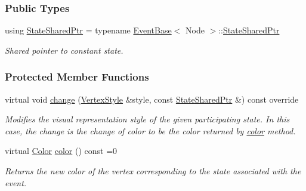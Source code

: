 \subsubsection*{Public Types}
\begin{DoxyCompactItemize}
\item 
using \hyperlink{structVertexColor_abb3b580256337f76f3071263e73d0e49}{State\+Shared\+Ptr} = typename \hyperlink{structEventBase}{Event\+Base}$<$ Node $>$\+::\hyperlink{structEventBase_a2c0edb5cda08ce1965f3440a97b3fc87}{State\+Shared\+Ptr}\hypertarget{structVertexColor_abb3b580256337f76f3071263e73d0e49}{}\label{structVertexColor_abb3b580256337f76f3071263e73d0e49}

\begin{DoxyCompactList}\small\item\em Shared pointer to constant state. \end{DoxyCompactList}\end{DoxyCompactItemize}
\subsubsection*{Protected Member Functions}
\begin{DoxyCompactItemize}
\item 
virtual void \hyperlink{structVertexColor_a4c1fb46de9c026e145eb16c6c402ff88}{change} (\hyperlink{structVertexStyle}{Vertex\+Style} \&style, const \hyperlink{structEventBase_a2c0edb5cda08ce1965f3440a97b3fc87}{State\+Shared\+Ptr} \&) const override\hypertarget{structVertexColor_a4c1fb46de9c026e145eb16c6c402ff88}{}\label{structVertexColor_a4c1fb46de9c026e145eb16c6c402ff88}

\begin{DoxyCompactList}\small\item\em Modifies the visual representation style of the given participating state. In this case, the change is the change of color to be the color returned by \hyperlink{structVertexColor_ad5d97b153b4c3b49c9377d1b6eb6184f}{color} method. \end{DoxyCompactList}\item 
virtual \hyperlink{colors_8h_ab87bacfdad76e61b9412d7124be44c1c}{Color} \hyperlink{structVertexColor_ad5d97b153b4c3b49c9377d1b6eb6184f}{color} () const =0
\begin{DoxyCompactList}\small\item\em Returns the new color of the vertex corresponding to the state associated with the event. \end{DoxyCompactList}\end{DoxyCompactItemize}
